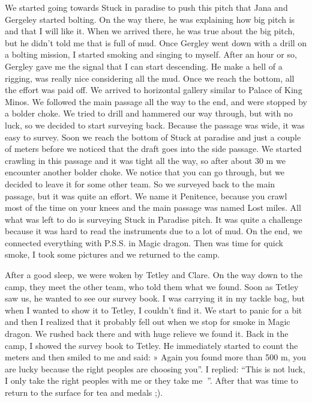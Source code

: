 We started going towards Stuck in paradise to push this pitch that Jana
and Gergeley started bolting. On the way there, he was explaining how
big pitch is and that I will like it. When we arrived there, he was true
about the big pitch, but he didn't told me that is full of mud. Once
Gergley went down with a drill on a bolting mission, I started smoking
and singing to myself. After an hour or so, Gergley gave me the signal
that I can start descending. He make a hell of a rigging, was really
nice considering all the mud. Once we reach the bottom, all the effort
was paid off. We arrived to horizontal gallery similar to Palace of King
Minos. We followed the main passage all the way to the end, and were
stopped by a bolder choke. We tried to drill and hammered our way
through, but with no luck, so we decided to start surveying back.
Because the passage was wide, it was easy to survey. Soon we reach the
bottom of Stuck at paradise and just a couple of meters before we
noticed that the draft goes into the side passage. We started crawling
in this passage and it was tight all the way, so after about 30 m we
encounter another bolder choke. We notice that you can go through, but
we decided to leave it for some other team. So we surveyed back to the
main passage, but it was quite an effort. We name it Penitence, because
you crawl most of the time on your knees and the main passage was named
Lost miles. All what was left to do is surveying Stuck in Paradise
pitch. It was quite a challenge because it was hard to read the
instruments due to a lot of mud. On the end, we connected everything
with P.S.S. in Magic dragon. Then was time for quick smoke, I took some
pictures and we returned to the camp.

After a good sleep, we were woken by Tetley and Clare. On the way down
to the camp, they meet the other team, who told them what we found. Soon
as Tetley saw us, he wanted to see our survey book. I was carrying it in
my tackle bag, but when I wanted to show it to Tetley, I couldn't find
it. We start to panic for a bit and then I realized that it probably
fell out when we stop for smoke in Magic dragon. We rushed back there
and with huge relieve we found it. Back in the camp, I showed the survey
book to Tetley. He immediately started to count the meters and then
smiled to me and said: » Again you found more than 500 m, you are lucky
because the right peoples are choosing you''. I replied: ``This is not
luck, I only take the right peoples with me or they take me''. After
that was time to return to the surface for tea and medals ;).

